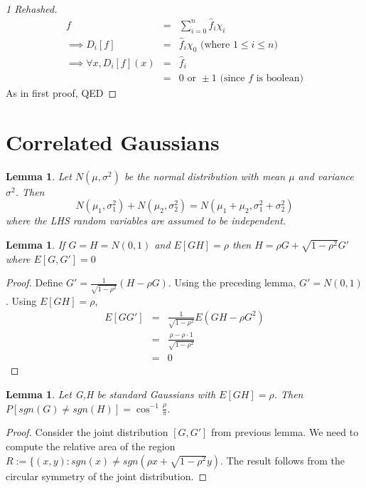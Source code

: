\documentclass{sig-alternate}
\newtheorem{lemma}[theorem]{Lemma}
\begin{document}
\begin{proof}[1 Rehashed]
\begin{eqnarray*}
f & = & \sum_{i=0}^{n} \hat{f}_i\chi_i \\
\implies D_i[f] & = & \hat{f}_i\chi_0 \mbox{   (where } 1\leq i \leq n \mbox{)} \\
\implies \forall x, D_i[f](x) & = & \hat{f}_i \\
	& = & 0 \mbox{ or } \pm 1 \mbox{ (since $f$ is boolean)}
\end{eqnarray*}
As in first proof, QED
\end{proof}
 
\section{Correlated Gaussians}
\begin{lemma}
Let $N(\mu,\sigma^2)$ be the normal distribution with mean $\mu$ and variance $\sigma^2$. Then \[N(\mu_1,\sigma_1^2) + N(\mu_2, \sigma_2^2) = N(\mu_1 + \mu_2, \sigma_1^2 + \sigma_2^2)\] where the LHS random variables are assumed to be independent.
\end{lemma}

\begin{lemma}
If $G = H = N(0,1)$ and $E[GH] = \rho$ then $H = \rho G + \sqrt{1 - \rho^2}G'$ where $E[G,G'] = 0$
\end{lemma}
\begin{proof}
Define $G' = \frac{1}{\sqrt{1 - \rho^2}}(H - \rho G)$. Using the preceding lemma, $G' = N(0,1)$. Using $E[GH] = \rho$,
\begin{eqnarray*}
E[GG'] & =  & \frac{1}{\sqrt{1 - \rho^2}}E(GH - \rho G^2) \\
 & = & \frac{\rho - \rho \cdot 1}{\sqrt{1 - \rho^2}} \\
 & = & 0
\end{eqnarray*}
\end{proof}

\begin{lemma}
Let G,H be standard Gaussians with $E[GH] = \rho$. Then $P[sgn(G) \neq sgn(H)] = \cos^{-1}\frac{\rho}{\pi}$.
\end{lemma}

\begin{proof}
Consider the joint distribution $[G,G']$ from previous lemma. We need to compute the relative area of the region $R := \{(x,y): sgn(x) \neq sgn(\rho x + \sqrt{1 - \rho^2}y)$. The result follows from the circular symmetry of the joint distribution.
\end{proof}
\end{document}
